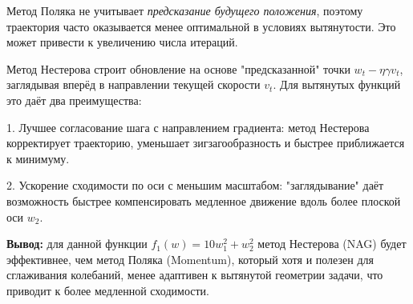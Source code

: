 Метод Поляка не учитывает \textit{предсказание будущего положения}, поэтому траектория часто оказывается менее оптимальной в условиях вытянутости. Это может привести к увеличению числа итераций.

Метод Нестерова строит обновление на основе "предсказанной" точки \( w_t - \eta \gamma v_t \), заглядывая вперёд в направлении текущей скорости \( v_t \). Для вытянутых функций это даёт два преимущества:

1. Лучшее согласование шага с направлением градиента:  
    метод Нестерова корректирует траекторию, уменьшает зигзагообразность и быстрее приближается к минимуму.

2. Ускорение сходимости по оси с меньшим масштабом:  
   "заглядывание" даёт возможность быстрее компенсировать медленное движение вдоль более плоской оси \( w_2 \).

\textbf{Вывод: } для данной функции \( f_1(w) = 10w_1^2 + w_2^2 \) метод Нестерова (NAG) будет эффективнее, чем метод Поляка (Momentum), который хотя и полезен для сглаживания колебаний, менее адаптивен к вытянутой геометрии задачи, что приводит к более медленной сходимости.
